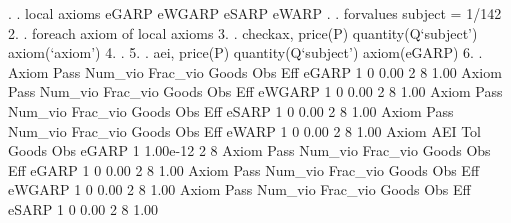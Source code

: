 . 
. local axioms eGARP eWGARP eSARP eWARP
{\smallskip}
. 
. forvalues subject = 1/142 {\lbr}
  2.         
.         foreach axiom of local axioms {\lbr}
  3.         
.                 checkax, price(P) quantity(Q`subject') axiom(`axiom')
  4.         
.         {\rbr}
  5. 
.         aei, price(P) quantity(Q`subject') axiom(eGARP)
  6. 
. {\rbr}
{\smallskip}
{\smallskip}
{\smallskip}
       Axiom {\VBAR} Pass     Num_vio    Frac_vio       Goods         Obs         Eff  
       eGARP {\VBAR}    1           0        0.00           2           8        1.00  
{\smallskip}
{\smallskip}
{\smallskip}
       Axiom {\VBAR} Pass     Num_vio    Frac_vio       Goods         Obs         Eff  
      eWGARP {\VBAR}    1           0        0.00           2           8        1.00  
{\smallskip}
{\smallskip}
{\smallskip}
       Axiom {\VBAR} Pass     Num_vio    Frac_vio       Goods         Obs         Eff  
       eSARP {\VBAR}    1           0        0.00           2           8        1.00  
{\smallskip}
{\smallskip}
{\smallskip}
       Axiom {\VBAR} Pass     Num_vio    Frac_vio       Goods         Obs         Eff  
       eWARP {\VBAR}    1           0        0.00           2           8        1.00  
{\smallskip}
       Axiom {\VBAR}       AEI        Tol      Goods        Obs 
       eGARP {\VBAR}         1   1.00e-12          2          8 
{\smallskip}
{\smallskip}
{\smallskip}
       Axiom {\VBAR} Pass     Num_vio    Frac_vio       Goods         Obs         Eff  
       eGARP {\VBAR}    1           0        0.00           2           8        1.00  
{\smallskip}
{\smallskip}
{\smallskip}
       Axiom {\VBAR} Pass     Num_vio    Frac_vio       Goods         Obs         Eff  
      eWGARP {\VBAR}    1           0        0.00           2           8        1.00  
{\smallskip}
{\smallskip}
{\smallskip}
       Axiom {\VBAR} Pass     Num_vio    Frac_vio       Goods         Obs         Eff  
       eSARP {\VBAR}    1           0        0.00           2           8        1.00  
{\smallskip}
{\smallskip}
